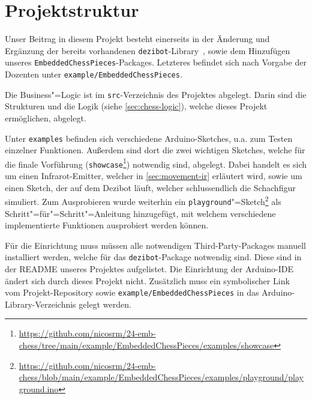 
\section{Projektstruktur}
\label{sec:final-project-structure}

Unser Beitrag in diesem Projekt besteht einerseits in der Änderung und Ergänzung der bereits vorhandenen \texttt{dezibot}-Library~\cite{dezibotteamDezibotDezibot2025}, sowie dem Hinzufügen unseres \texttt{EmbeddedChessPieces}-Packages. Letzteres befindet sich nach Vorgabe der Dozenten unter \texttt{example/EmbeddedChessPieces}.

Die Business"=Logic ist im \texttt{src}-Verzeichnis des Projektes abgelegt. Darin sind die Strukturen und die Logik (siehe \autoref{sec:chess-logic}), welche dieses Projekt ermöglichen, abgelegt.

Unter \texttt{examples} befinden sich verschiedene Arduino-Sketches, u.a. zum Testen einzelner Funktionen. Außerdem sind dort die zwei wichtigen Sketches, welche für die finale Vorführung (\texttt{showcase}\footnote{\url{https://github.com/nicosrm/24-emb-chess/tree/main/example/EmbeddedChessPieces/examples/showcase}}) notwendig sind, abgelegt. Dabei handelt es sich um einen Infrarot-Emitter, welcher in \autoref{sec:movement-ir} erläutert wird, sowie um einen Sketch, der auf dem Dezibot läuft, welcher schlussendlich die Schachfigur simuliert. Zum Ausprobieren wurde weiterhin ein \texttt{playground}"=Sketch\footnote{\url{https://github.com/nicosrm/24-emb-chess/blob/main/example/EmbeddedChessPieces/examples/playground/playground.ino}} als Schritt"=für"=Schritt"=Anleitung hinzugefügt, mit welchem verschiedene implementierte Funktionen ausprobiert werden können.

Für die Einrichtung muss müssen alle notwendigen Third-Party-Packages manuell installiert werden, welche für das \texttt{dezibot}-Package notwendig sind. Diese sind in der README unseres Projektes aufgelistet. Die Einrichtung der Arduino-IDE ändert sich durch dieses Projekt nicht. Zusätzlich muss ein symbolischer Link vom Projekt-Repository sowie \texttt{example/EmbeddedChessPieces} in das Arduino-Library-Verzeichnis gelegt werden.
